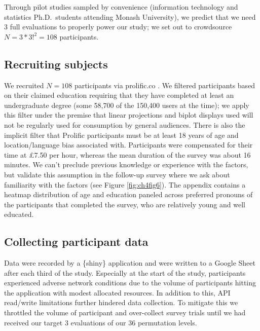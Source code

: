 \documentclass{monashthesis}
\begin{document}
Through pilot studies sampled by convenience (information technology and statistics Ph.D.~students attending Monash University), we predict that we need 3 full evaluations to properly power our study; we set out to crowdsource \(N = 3 * 3!^2 = 108\) participants.

\hypertarget{sec:subjects}{%
\subsection{Recruiting subjects}\label{sec:subjects}}

We recruited \(N = 108\) participants via prolific.co \autocite{palan_prolific_2018}. We filtered participants based on their claimed education requiring that they have completed at least an undergraduate degree (some 58,700 of the 150,400 users at the time); we apply this filter under the premise that linear projections and biplot displays used will not be regularly used for consumption by general audiences. There is also the implicit filter that Prolific participants must be at least 18 years of age and location/language bias associated with. Participants were compensated for their time at \pounds 7.50 per hour, whereas the mean duration of the survey was about 16 minutes. We can't preclude previous knowledge or experience with the factors, but validate this assumption in the follow-up survey where we ask about familiarity with the factors (see Figure \ref{fig:ch4fig6}). The appendix contains a heatmap distribution of age and education paneled across preferred pronouns of the participants that completed the survey, who are relatively young and well educated.

\hypertarget{collecting-participant-data}{%
\subsection{Collecting participant data}\label{collecting-participant-data}}

Data were recorded by a \{shiny\} application and were written to a Google Sheet after each third of the study. Especially at the start of the study, participants experienced adverse network conditions due to the volume of participants hitting the application with modest allocated resources. In addition to this, API read/write limitations further hindered data collection. To mitigate this we throttled the volume of participant and over-collect survey trials until we had received our target 3 evaluations of our 36 permutation levels.
\end{document}
